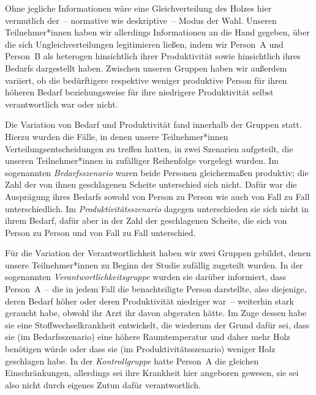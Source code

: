 \documentclass[justified,nobib,symmetric,twoside]{tufte-handout}
\begin{document}
Ohne jegliche Informationen wäre eine Gleichverteilung des Holzes hier vermutlich der~-- normative wie deskriptive~-- Modus der Wahl.
Unseren Teilnehmer*innen haben wir allerdings Informationen an die Hand gegeben, über die sich Ungleichverteilungen legitimieren ließen, indem wir Person~A und Person~B als heterogen hinsichtlich ihrer Produktivität sowie hinsichtlich ihres Bedarfs dargestellt haben.
Zwischen unseren Gruppen haben wir außerdem variiert, ob die bedürftigere respektive weniger produktive Person für ihren höheren Bedarf beziehungsweise für ihre niedrigere Produktivität selbst verantwortlich war oder nicht.

Die Variation von Bedarf und Produktivität fand innerhalb der Gruppen statt.
Hierzu wurden die Fälle, in denen unsere Teilnehmer*innen Verteilungsentscheidungen zu treffen hatten, in zwei Szenarien aufgeteilt, die unseren Teilnehmer*innen in zufälliger Reihenfolge vorgelegt wurden.
Im sogenannten \textit{Bedarfsszenario} waren beide Personen gleichermaßen produktiv; die Zahl der von ihnen geschlagenen Scheite unterschied sich nicht.
Dafür war die Ausprägung ihres Bedarfs sowohl von Person zu Person wie auch von Fall zu Fall unterschiedlich.
Im \textit{Produktivitätsszenario} dagegen unterschieden sie sich nicht in ihrem Bedarf, dafür aber in der Zahl der geschlagenen Scheite, die sich von Person zu Person und von Fall zu Fall unterschied.

Für die Variation der Verantwortlichkeit haben wir zwei Gruppen gebildet, denen unsere Teilnehmer*innen zu Beginn der Studie zufällig zugeteilt wurden.
In der sogenannten \textit{Verantwortlichkeitsgruppe} wurden sie darüber informiert, dass Person~A~-- die in jedem Fall die benachteiligte Person darstellte, also diejenige, deren Bedarf höher oder deren Produktivität niedriger war~-- weiterhin stark geraucht habe, obwohl ihr Arzt ihr davon abgeraten hätte.
Im Zuge dessen habe sie eine Stoffwechselkrankheit entwickelt, die wiederum der Grund dafür sei, dass sie (im Bedarfsszenario) eine höhere Raumtemperatur und daher mehr Holz benötigen würde oder dass sie (im Produktivitätsszenario) weniger Holz geschlagen habe.
In der \textit{Kontrollgruppe} hatte Person~A die gleichen Einschränkungen, allerdings sei ihre Krankheit hier angeboren gewesen, sie sei also nicht durch eigenes Zutun dafür verantwortlich.
\end{document}
